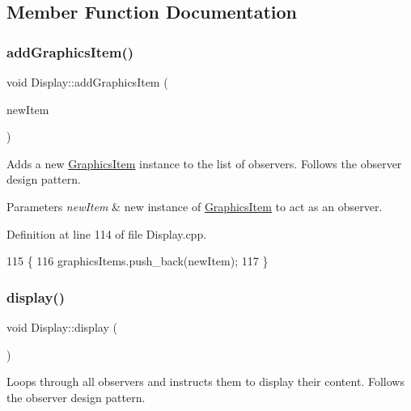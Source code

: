\subsection{Member Function Documentation}
\mbox{\label{classDisplay_a2374289dfe325db9f908499f7907528a}} 
\subsubsection{\texorpdfstring{add\+Graphics\+Item()}{addGraphicsItem()}}
{\footnotesize\ttfamily void Display\+::add\+Graphics\+Item (\begin{DoxyParamCaption}\item[{\mbox{\hyperlink{classGraphicsItem}{Graphics\+Item}} $\ast$const}]{new\+Item }\end{DoxyParamCaption})}

Adds a new \mbox{\hyperlink{classGraphicsItem}{Graphics\+Item}} instance to the list of observers. Follows the observer design pattern. 
\begin{DoxyParams}{Parameters}
{\em new\+Item} & new instance of \mbox{\hyperlink{classGraphicsItem}{Graphics\+Item}} to act as an observer. \\
\hline
\end{DoxyParams}


Definition at line 114 of file Display.\+cpp.


\begin{DoxyCode}
115 \{
116   graphicsItems.push\_back(newItem);
117 \}
\end{DoxyCode}
\mbox{\label{classDisplay_aa3ab70ec7b76fa3ed139d19e53e72283}} 
\subsubsection{\texorpdfstring{display()}{display()}}
{\footnotesize\ttfamily void Display\+::display (\begin{DoxyParamCaption}{ }\end{DoxyParamCaption})\hspace{0.3cm}{\ttfamily [static]}}

Loops through all observers and instructs them to display their content. Follows the observer design pattern. 

